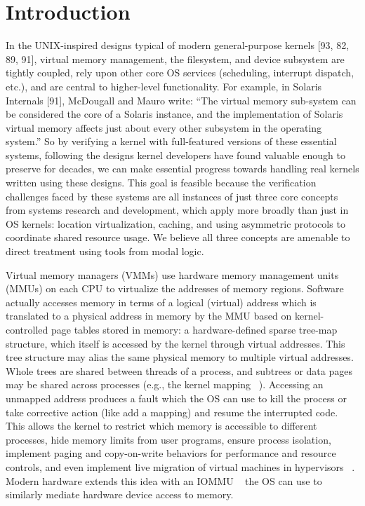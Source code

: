 \section{Introduction}
\label{sec:intro}
In the UNIX-inspired designs typical of modern general-purpose kernels [93, 82, 89, 91], virtual memory management, the filesystem, and device subsystem are tightly
coupled, rely upon other core OS services (scheduling, interrupt dispatch, etc.), and are central
to higher-level functionality. For example, in Solaris Internals [91], McDougall and Mauro write:
“The virtual memory sub-system can be considered the core of a Solaris instance, and the implementation of Solaris virtual memory affects just about every other subsystem in the operating
system.” So by verifying a kernel with full-featured versions of these essential systems, following the
designs kernel developers have found valuable enough to preserve for decades, we can make essential
progress towards handling real kernels written using these designs. This goal is feasible because
the verification challenges faced by these systems are all instances of just three core concepts from
systems research and development, which apply more broadly than just in OS kernels: location
virtualization, caching, and using asymmetric protocols to coordinate shared resource usage. We
believe all three concepts are amenable to direct treatment using tools from modal logic.

Virtual memory managers (VMMs) use hardware memory management units (MMUs) on each
CPU to virtualize the addresses of memory regions. Software actually accesses memory in terms of
a logical (virtual) address which is translated to a physical address in memory by the MMU based
on kernel-controlled page tables stored in memory: a hardware-defined sparse tree-map structure,
which itself is accessed by the kernel through virtual addresses. This tree structure may alias the
same physical memory to multiple virtual addresses. Whole trees are shared between threads of a
process, and subtrees or data pages may be shared across processes (e.g., the kernel mapping ~\cite{91,
93}). Accessing an unmapped address produces a fault which the OS can use to kill the process
or take corrective action (like add a mapping) and resume the interrupted code. This allows the
kernel to restrict which memory is accessible to different processes, hide memory limits from user
programs, ensure process isolation, implement paging and copy-on-write behaviors for performance
and resource controls, and even implement live migration of virtual machines in hypervisors ~\cite{110,
31}. Modern hardware extends this idea with an IOMMU ~\cite{71, 11} the OS can use to similarly
mediate hardware device access to memory.

